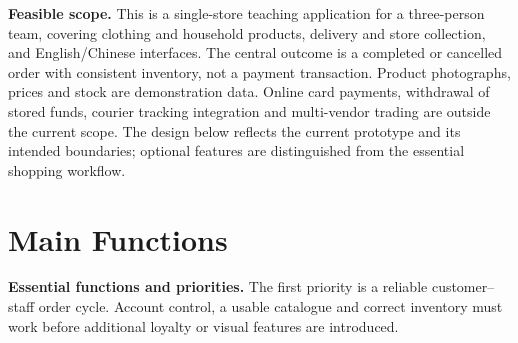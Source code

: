 \textbf{Feasible scope.} This is a single-store teaching application for a three-person team, covering clothing and household products, delivery and store collection, and English/Chinese interfaces. The central outcome is a completed or cancelled order with consistent inventory, not a payment transaction. Product photographs, prices and stock are demonstration data. Online card payments, withdrawal of stored funds, courier tracking integration and multi-vendor trading are outside the current scope. The design below reflects the current prototype and its intended boundaries; optional features are distinguished from the essential shopping workflow.

\newpage
\section{Main Functions}
\textbf{Essential functions and priorities.} The first priority is a reliable customer--staff order cycle. Account control, a usable catalogue and correct inventory must work before additional loyalty or visual features are introduced.
